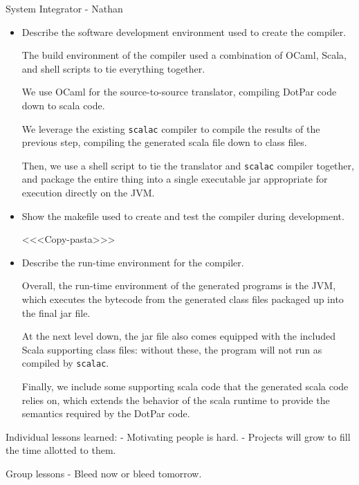 System Integrator - Nathan

\begin{itemize}
\item Describe the software development environment used to create the compiler.

The build environment of the compiler used a combination of OCaml,
Scala, and shell scripts to tie everything together.

We use OCaml for the source-to-source translator, compiling DotPar
code down to scala code.

We leverage the existing \texttt{scalac} compiler to compile the
results of the previous step, compiling the generated scala file down
to class files.

Then, we use a shell script to tie the translator and \texttt{scalac}
compiler together, and package the entire thing into a single
executable jar appropriate for execution directly on the JVM.

\item Show the makefile used to create and test the compiler during development.

<<<Copy-pasta>>>

\item Describe the run-time environment for the compiler.

Overall, the run-time environment of the generated programs is the
JVM, which executes the bytecode from the generated class files
packaged up into the final jar file.

At the next level down, the jar file also comes equipped with the
included Scala supporting class files: without these, the program will
not run as compiled by \texttt{scalac}. 

Finally, we include some supporting scala code that the generated
scala code relies on, which extends the behavior of the scala runtime
to provide the semantics required by the DotPar code.

\end{itemize}


Individual lessons learned:
 - Motivating people is hard.
 - Projects will grow to fill the time allotted to them.


Group lessons
 - Bleed now or bleed tomorrow.
